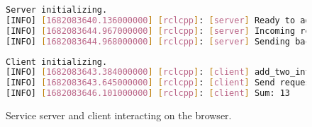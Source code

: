         \begin{figure}[htbp]
            \centering
            \vspace{1em}

            \begin{lstlisting}[language=Bash]
Server initializing.
[INFO] [1682083640.136000000] [rclcpp]: [server] Ready to add two ints.
[INFO] [1682083644.967000000] [rclcpp]: [server] Incoming request X: 5 Y: 8
[INFO] [1682083644.968000000] [rclcpp]: [server] Sending back response: [13]
\end{lstlisting}


            \begin{lstlisting}[language=Bash]
Client initializing.
[INFO] [1682083643.384000000] [rclcpp]: [client] add_two_ints_client X Y
[INFO] [1682083643.645000000] [rclcpp]: [client] Send request X: 5  Y: 8
[INFO] [1682083646.101000000] [rclcpp]: [client] Sum: 13
\end{lstlisting}

            \caption{Service server and client interacting on the browser.}
            \label{fig:ui4}
        \end{figure}




